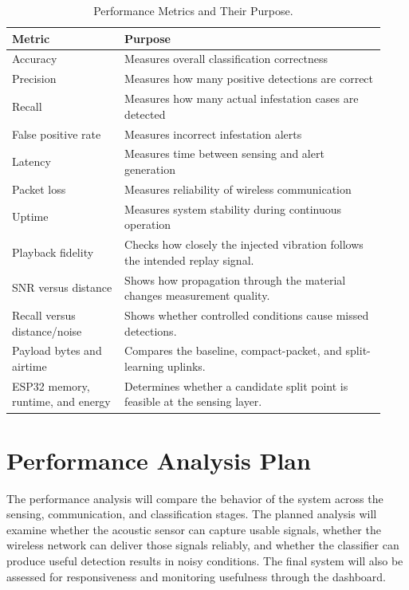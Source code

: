 \documentclass[12pt,a4paper,oneside]{memoir}
\newcommand{\newrevision}[1]{\textcolor{green!45!black}{#1}}
\begin{document}
\begin{table}[h]
\centering
\caption{Performance Metrics and Their Purpose.}
\label{tab:metrics}
\renewcommand{\arraystretch}{1.3}
\begin{tabular}{@{} p{0.28\linewidth} p{0.65\linewidth} @{}}
\toprule
\textbf{Metric} & \textbf{Purpose} \\
\midrule
Accuracy           & Measures overall classification correctness \\
Precision          & Measures how many positive detections are correct \\
Recall             & Measures how many actual infestation cases are detected \\
False positive rate & Measures incorrect infestation alerts \\
Latency            & Measures time between sensing and alert generation \\
Packet loss        & Measures reliability of wireless communication \\
Uptime             & Measures system stability during continuous operation \\
\newrevision{Playback fidelity} & \newrevision{Checks how closely the injected vibration follows the intended replay signal.} \\
\newrevision{SNR versus distance} & \newrevision{Shows how propagation through the material changes measurement quality.} \\
\newrevision{Recall versus distance/noise} & \newrevision{Shows whether controlled conditions cause missed detections.} \\
\newrevision{Payload bytes and airtime} & \newrevision{Compares the baseline, compact-packet, and split-learning uplinks.} \\
\newrevision{ESP32 memory, runtime, and energy} & \newrevision{Determines whether a candidate split point is feasible at the sensing layer.} \\
\bottomrule
\end{tabular}
\end{table}

\section{Performance Analysis Plan}

\label{sec:PerformanceAnalysisPlan}

The performance analysis will compare the behavior of the system across the sensing, communication, and classification stages. The planned analysis will examine whether the acoustic sensor can capture usable signals, whether the wireless network can deliver those signals reliably, and whether the classifier can produce useful detection results in noisy conditions. The final system will also be assessed for responsiveness and monitoring usefulness through the dashboard.
\end{document}
